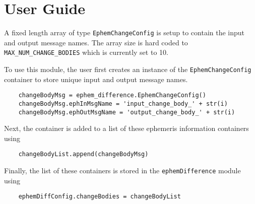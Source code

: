 
\section{User Guide}

A fixed length array of type {\tt EphemChangeConfig} is setup to contain the input and output message names.  The array size is hard coded to {\tt MAX\_NUM\_CHANGE\_BODIES} which is currently set to 10.  

To use this module, the user first creates an instance of the {\tt EphemChangeConfig} container to store unique input and output message names.
\begin{verbatim}
	changeBodyMsg = ephem_difference.EphemChangeConfig()
	changeBodyMsg.ephInMsgName = 'input_change_body_' + str(i)
	changeBodyMsg.ephOutMsgName = 'output_change_body_' + str(i)
\end{verbatim}
Next, the container is added to a list of these ephemeris information containers using 
\begin{verbatim}
	changeBodyList.append(changeBodyMsg)
\end{verbatim}
Finally, the list of these containers is stored in the {\tt ephemDifference} module using
\begin{verbatim}
	ephemDiffConfig.changeBodies = changeBodyList
\end{verbatim}

